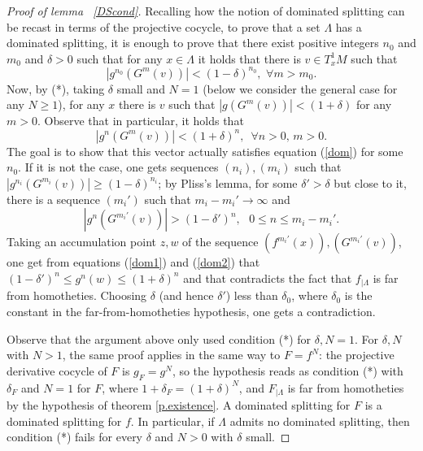 \documentclass[a4paper,11pt]{article}
\theoremstyle{definition}
\def\La{\Lambda}
\def\de{\delta}
\def\La{\Lambda}
\begin{document}
\begin{proof}[Proof of lemma ~\ref{DScond}] Recalling how the notion of dominated splitting can be recast in terms of the projective cocycle, to prove that a set $\La$ has a dominated splitting, it is enough to prove that there exist positive integers  $n_0$ and $m_0$ and $\de>0$ such that for any $x \in \La$ it holds that there is $v\in T^1_xM$ such that \begin{equation}\label{dom}
|g^{n_0}(G^m(v))| < (1-\de)^{n_0},\,\,\forall m>m_0.
\end{equation}
Now, by  (*),  taking $\de$  small and $N=1$ (below we consider the general case for any $N\geq 1$),   for any $x$ there is  $v$ such that  $|g(G^m(v))| < (1+\de)$ for any $ m>0.$ Observe that in particular, it holds that  \begin{equation}\label{dom1}|g^n(G^m(v))| < (1+\de)^n,\,\,\,\forall n>0, \,m>0.
\end{equation}
The goal is to show that  this vector actually satisfies equation (\ref{dom}) for some $n_0$. If it is not the case, one gets sequences $(n_i), (m_i)$ such that $|g^{n_i}(G^{m_i}(v))| \geq  (1-\de)^{n_i}$; by Pliss's lemma, for some $\de'>\de$ but close to it, there is a sequence $(m_i')$ such  that $m_i-m_i'\to \infty$ and 
\begin{equation}\label{dom2}|g^n(G^{m_i'}(v))| > (1-\de')^n,\,\,\,\, 0\leq n\leq m_i-m_i'.
\end{equation}
Taking an accumulation point  $z, w$ of the sequence $(f^{m_i'}(x)), (G^{m_i'}(v))$, one get from equations (\ref{dom1}) and (\ref{dom2}) that $(1-\de')^n\leq g^n(w)\leq (1+\de)^n$ and that contradicts the fact that $f_{|\La}$ is far from homotheties.  Choosing $\delta$
(and hence $\delta'$) less than $\delta_0$, where $\delta_0$ is the constant in the far-from-homotheties hypothesis, one gets a contradiction.


Observe that the argument above only used condition (*) for 
$\de,N=1$. For $\de,N$ with $N>1$, the same
proof applies in the same way  to $F=f^{N}$: the projective derivative cocycle of
$F$ is $g_F=g^{N}$, so the hypothesis reads as condition (*) with
 $\de_F$ and $N=1$ for $F$, where $1+\de_F=(1+\de)^{N}$, and
$F_{|\La}$ is far from homotheties by the hypothesis of theorem \ref{p.existence}. A dominated
splitting for $F$ is a dominated splitting for $f$. In particular, if
$\La$ admits no dominated splitting, then condition (*) fails for every
 $\de$ and $N>0$ with $\de$ small.

\end{proof}
\end{document}
